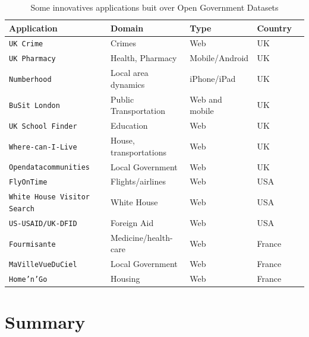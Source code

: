 \begin{table}[ht!b]
    \caption{Some innovatives applications buit over Open Government Datasets} \label{tab:apps-survey}
    \small
    \center
   \begin{tabularx}{\textwidth}{@{}llllX@{}}
    \toprule
    \textbf{Application} & \textbf{Domain} & \textbf{Type} &  \textbf{Country}  \\
    \toprule
    \texttt{UK Crime} &	Crimes & Web & UK  \\
    \midrule
\texttt{UK Pharmacy} & Health, Pharmacy  & Mobile/Android  & UK \\ 
	\midrule
	\texttt{Numberhood} & Local area dynamics  & iPhone/iPad & UK \\
	
	\midrule
	\texttt{BuSit London} & Public Transportation  & Web and mobile  & UK \\
	
	\midrule
	\texttt{UK School Finder} & Education  & Web  & UK \\
	
	\midrule
	\texttt{Where-can-I-Live} & House, transportations & Web  & UK \\
	\midrule
	
	\texttt{Opendatacommunities} & Local Government & Web  & UK \\
	\midrule
	
	\texttt{FlyOnTime } & Flights/airlines & Web  & USA \\
	\midrule
	
	\texttt{White House Visitor Search} & White House & Web  & USA \\
	\midrule
	
	\texttt{US-USAID/UK-DFID} & Foreign Aid & Web  & USA \\
	\midrule
	
	\texttt{Fourmisante} & Medicine/health-care & Web  & France \\
	\midrule
	
	\texttt{MaVilleVueDuCiel} & Local Government  & Web & France \\
	\midrule
	
	\texttt{Home'n'Go } & Housing & Web & France \\
	
	
    \bottomrule
  
    \end{tabularx}
    \end{table}
    
  \section{Summary}
  
